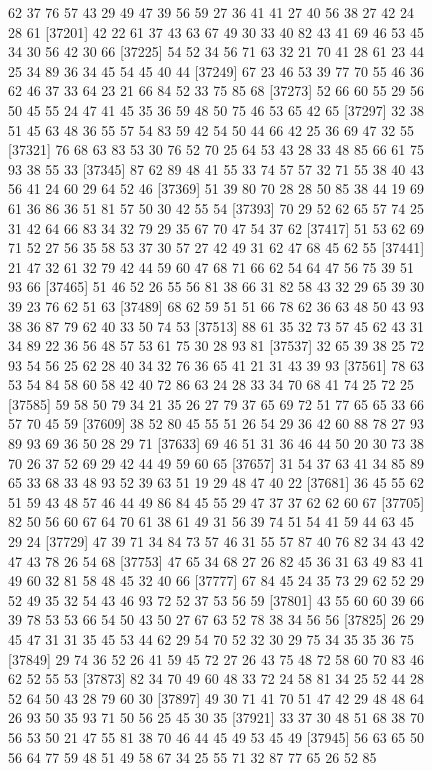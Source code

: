 \documentclass{article}
\begin{document}
\begin{figure}[H]
\begin{Schunk}
\begin{Soutput}
[37177] 62 37 76 57 43 29 49 47 39 56 59 27 36 41 41 27 40 56 38 27 42 24 28 61
[37201] 42 22 61 37 43 63 67 49 30 33 40 82 43 41 69 46 53 45 34 30 56 42 30 66
[37225] 54 52 34 56 71 63 32 21 70 41 28 61 23 44 25 34 89 36 34 45 54 45 40 44
[37249] 67 23 46 53 39 77 70 55 46 36 62 46 37 33 64 23 21 66 84 52 33 75 85 68
[37273] 52 66 60 55 29 56 50 45 55 24 47 41 45 35 36 59 48 50 75 46 53 65 42 65
[37297] 32 38 51 45 63 48 36 55 57 54 83 59 42 54 50 44 66 42 25 36 69 47 32 55
[37321] 76 68 63 83 53 30 76 52 70 25 64 53 43 28 33 48 85 66 61 75 93 38 55 33
[37345] 87 62 89 48 41 55 33 74 57 57 32 71 55 38 40 43 56 41 24 60 29 64 52 46
[37369] 51 39 80 70 28 28 50 85 38 44 19 69 61 36 86 36 51 81 57 50 30 42 55 54
[37393] 70 29 52 62 65 57 74 25 31 42 64 66 83 34 32 79 29 35 67 70 47 54 37 62
[37417] 51 53 62 69 71 52 27 56 35 58 53 37 30 57 27 42 49 31 62 47 68 45 62 55
[37441] 21 47 32 61 32 79 42 44 59 60 47 68 71 66 62 54 64 47 56 75 39 51 93 66
[37465] 51 46 52 26 55 56 81 38 66 31 82 58 43 32 29 65 39 30 39 23 76 62 51 63
[37489] 68 62 59 51 51 66 78 62 36 63 48 50 43 93 38 36 87 79 62 40 33 50 74 53
[37513] 88 61 35 32 73 57 45 62 43 31 34 89 22 36 56 48 57 53 61 75 30 28 93 81
[37537] 32 65 39 38 25 72 93 54 56 25 62 28 40 34 32 76 36 65 41 21 31 43 39 93
[37561] 78 63 53 54 84 58 60 58 42 40 72 86 63 24 28 33 34 70 68 41 74 25 72 25
[37585] 59 58 50 79 34 21 35 26 27 79 37 65 69 72 51 77 65 65 33 66 57 70 45 59
[37609] 38 52 80 45 55 51 26 54 29 36 42 60 88 78 27 93 89 93 69 36 50 28 29 71
[37633] 69 46 51 31 36 46 44 50 20 30 73 38 70 26 37 52 69 29 42 44 49 59 60 65
[37657] 31 54 37 63 41 34 85 89 65 33 68 33 48 93 52 39 63 51 19 29 48 47 40 22
[37681] 36 45 55 62 51 59 43 48 57 46 44 49 86 84 45 55 29 47 37 37 62 62 60 67
[37705] 82 50 56 60 67 64 70 61 38 61 49 31 56 39 74 51 54 41 59 44 63 45 29 24
[37729] 47 39 71 34 84 73 57 46 31 55 57 87 40 76 82 34 43 42 47 43 78 26 54 68
[37753] 47 65 34 68 27 26 82 45 36 31 63 49 83 41 49 60 32 81 58 48 45 32 40 66
[37777] 67 84 45 24 35 73 29 62 52 29 52 49 35 32 54 43 46 93 72 52 37 53 56 59
[37801] 43 55 60 60 39 66 39 78 53 53 66 54 50 43 50 27 67 63 52 78 38 34 56 56
[37825] 26 29 45 47 31 31 35 45 53 44 62 29 54 70 52 32 30 29 75 34 35 35 36 75
[37849] 29 74 36 52 26 41 59 45 72 27 26 43 75 48 72 58 60 70 83 46 62 52 55 53
[37873] 82 34 70 49 60 48 33 72 24 58 81 34 25 52 44 28 52 64 50 43 28 79 60 30
[37897] 49 30 71 41 70 51 47 42 29 48 48 64 26 93 50 35 93 71 50 56 25 45 30 35
[37921] 33 37 30 48 51 68 38 70 56 53 50 21 47 55 81 38 70 46 44 45 49 53 45 49
[37945] 56 63 65 50 56 64 77 59 48 51 49 58 67 34 25 55 71 32 87 77 65 26 52 85

\end{Soutput}
\end{Schunk}
\end{figure}
\end{document}
